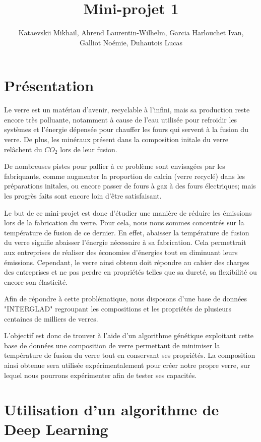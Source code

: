 \documentclass{article}
\title{Mini-projet 1}
\author{Kataevskii Mikhail, Ahrend Laurentin-Wilhelm, Garcia Harlouchet Ivan, \\ Galliot Noémie, Duhautois Lucas}
\begin{document}
\maketitle

\section{Présentation}

Le verre est un matériau d'avenir, recyclable à l'infini, mais sa production reste encore très polluante, notamment à cause de l'eau utilisée pour refroidir les systèmes et l'énergie dépensée pour chauffer les fours qui servent à la fusion du verre. De plus, les minéraux présent dans la composition initale du verre relâchent du $CO_2$ lors de leur fusion.

De nombreuses pistes pour pallier à ce problème sont envisagées par les fabriquants, comme augmenter la proportion de calcin (verre recyclé) dans les préparations initales, ou encore passer de fours à gaz à des fours électriques; mais les progrès faits sont encore loin d'être satisfaisant.

Le but de ce mini-projet est donc d'étudier une manière de réduire les émissions lors de la fabrication du verre. Pour cela, nous nous sommes concentrés sur la température de fusion de ce dernier. En effet, abaisser la température de fusion du verre signifie abaisser l'énergie nécessaire à sa fabrication. Cela permettrait aux entreprises de réaliser des économies d'énergies tout en diminuant leurs émissions.
Cependant, le verre ainsi obtenu doit répondre au cahier des charges des entreprises et ne pas perdre en propriétés telles que sa dureté, sa flexibilité ou encore son élasticité.

Afin de répondre à cette problématique, nous disposons d'une base de données "INTERGLAD" regroupant les compositions et les propriétés de plusieurs centaines de milliers de verres.

L'objectif est donc de trouver à l'aide d'un algorithme génétique exploitant cette base de données une composition de verre permettant de minimiser la température de fusion du verre tout en conservant ses propriétés. La composition ainsi obtenue sera utilisée expérimentalement pour créer notre propre verre, sur lequel nous pourrons expérimenter afin de tester ses capacités.

\section{Utilisation d'un algorithme de Deep Learning}
\end{document}

